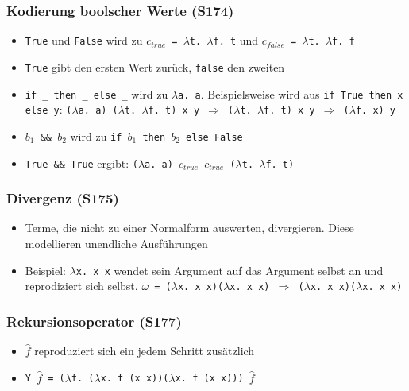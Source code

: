 \subsubsection{Kodierung boolscher Werte (S174)}
\begin{itemize}
	\item \texttt{True} und \texttt{False} wird zu \texttt{\(c_{true}\) = \(\lambda\)t. \(\lambda\)f. t} und \texttt{\(c_{false}\) = \(\lambda\)t. \(\lambda\)f. f}
	\item \texttt{True} gibt den ersten Wert zurück, \texttt{false} den zweiten
	\item \texttt{if \_ then \_ else \_} wird zu \texttt{\(\lambda\)a. a}. Beispielsweise wird aus \texttt{if True then x else y}: \texttt{(\(\lambda\)a. a) (\(\lambda\)t. \(\lambda\)f. t) x y \(\Rightarrow\) (\(\lambda\)t. \(\lambda\)f. t) x y \(\Rightarrow\) (\(\lambda\)f. x) y}
	\item \texttt{\(b_1\) \&\& \(b_2\)} wird zu \texttt{if \(b_1\) then \(b_2\) else False}
	\item \texttt{True \&\& True} ergibt: \texttt{(\(\lambda\)a. a) \(c_{true}\) \(c_{true}\) (\(\lambda\)t. \(\lambda\)f. t)}
\end{itemize}

\subsubsection{Divergenz (S175)}
\begin{itemize}
	\item Terme, die nicht zu einer Normalform auswerten, divergieren. Diese modellieren unendliche Ausführungen
	\item Beispiel: \texttt{\(\lambda\)x. x x} wendet sein Argument auf das Argument selbst an und reprodiziert sich selbst. \texttt{\(\omega\) = (\(\lambda\)x. x x)(\(\lambda\)x. x x) \(\Rightarrow\) (\(\lambda\)x. x x)(\(\lambda\)x. x x)}
\end{itemize}

\subsubsection{Rekursionsoperator (S177)} %
\begin{itemize}
	\item \texttt{\(\hat{f}\)} reproduziert sich ein jedem Schritt zusätzlich
	\item \texttt{Y \(\hat{f}\) = (\(\lambda\)f. (\(\lambda\)x. f (x x))(\(\lambda\)x. f (x x))) \(\hat{f}\)}
\end{itemize}

